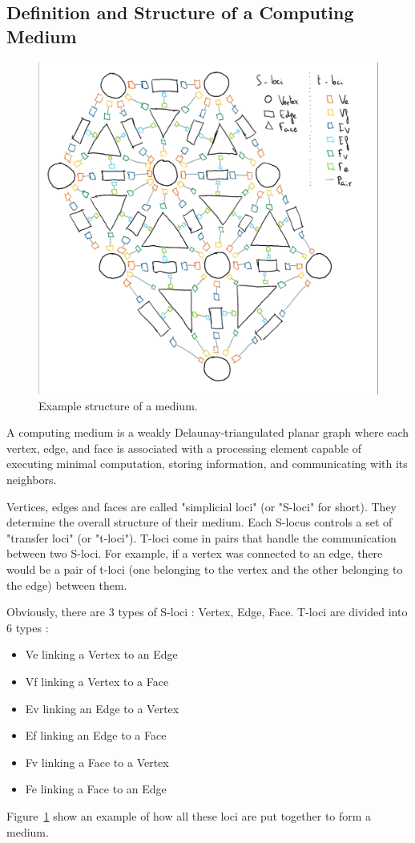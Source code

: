 \documentclass{article}
\begin{document}
\subsection{Definition and Structure of a Computing Medium}

\begin{figure}[H]
	\centering\includegraphics[width=0.9\linewidth]{assets/handdrawn_medium.png}
	\caption{Example structure of a medium.}
	\label{fig:example_structure}
\end{figure}

A computing medium is a weakly Delaunay-triangulated planar graph where each vertex, edge, and face is associated with a processing element capable of executing minimal computation, storing information, and communicating with its neighbors.

Vertices, edges and faces are called "simplicial loci" (or "S-loci" for short). They determine the overall structure of their medium. Each S-locus controls a set of "transfer loci" (or "t-loci"). T-loci come in pairs that handle the communication between two S-loci. For example, if a vertex was connected to an edge, there would be a pair of t-loci (one belonging to the vertex and the other belonging to the edge) between them.

Obviously, there are 3 types of S-loci : Vertex, Edge, Face. T-loci are divided into 6 types : 
\begin{itemize}[noitemsep,nosep]
	\item Ve linking a  Vertex to an Edge
	\item Vf linking a  Vertex to a  Face
	\item Ev linking an Edge   to a  Vertex
	\item Ef linking an Edge   to a  Face
	\item Fv linking a  Face   to a  Vertex
	\item Fe linking a  Face   to an Edge
\end{itemize}
Figure~\ref{fig:example_structure} show an example of how all these loci are put together to form a medium.
\end{document}
